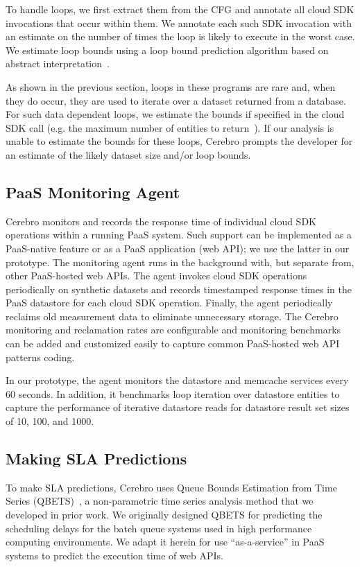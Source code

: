 To handle loops, we first extract them from the CFG and 
annotate all cloud SDK invocations that occur within them.
We annotate each such SDK invocation with an estimate on the number of times
the loop is likely to execute in the worst case. 
We estimate loop bounds using a loop bound prediction algorithm 
based on abstract interpretation~\cite{bygde2010static}. 

As shown in the previous section, loops in these programs 
are rare and, when they do occur, they are
used to iterate over a dataset returned from a database.
For such data dependent loops, we estimate the bounds if specified 
in the cloud SDK call (e.g. the maximum number of 
entities to return~\cite{gae-fetch-options}).
If our analysis is unable to estimate the bounds for these loops, Cerebro prompts
the developer for an estimate of the likely dataset size and/or loop bounds.

\subsection{PaaS Monitoring Agent}
Cerebro monitors and records the response time of individual
cloud SDK operations within a running PaaS system.  Such support can be 
implemented as a PaaS-native feature or as
a PaaS application (web API); we use the latter in our prototype.
The monitoring agent runs in the background with, but separate from, 
other PaaS-hosted web APIs.
The agent invokes cloud SDK operations periodically on synthetic datasets and 
records timestamped response times in the PaaS datastore for each cloud SDK
operation.
Finally, the agent periodically reclaims old measurement data
to eliminate unnecessary storage. The Cerebro monitoring and reclamation 
rates are configurable and monitoring benchmarks can be added and customized
easily to capture common PaaS-hosted web API patterns coding.

In our prototype, the agent monitors the datastore and memcache services
every 60 seconds.  In addition, it 
benchmarks loop iteration over datastore entities to capture
the performance of iterative datastore reads for datastore result set sizes 
of 10, 100, and 1000.

\subsection{Making SLA Predictions}
To make SLA predictions, Cerebro uses 
Queue Bounds Estimation from Time Series (QBETS)~\cite{Nurmi:2007:QQB:1791551.1791556},
a non-parametric time series analysis method that we developed in prior work.
We originally designed QBETS for
predicting the scheduling delays for the batch queue systems 
used in high performance computing environments. 
We adapt it herein for use ``as-a-service'' in PaaS systems 
to predict the execution time of web APIs.

